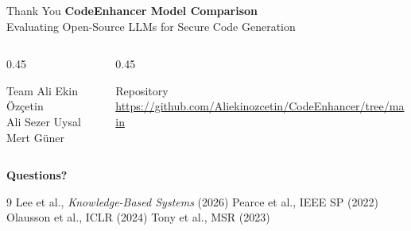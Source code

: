 \documentclass[aspectratio=169]{beamer}
\begin{document}
\begin{frame}{Thank You}
  \centering
  \vspace{0.8em}
  {\Large \textbf{CodeEnhancer Model Comparison}}\\[0.4em]
  {\normalsize Evaluating Open-Source LLMs for Secure Code Generation}

  \vspace{1.2em}

  \begin{columns}[c]
    \begin{column}{0.45\textwidth}
      \centering
      \begin{block}{Team}
        Ali Ekin Özçetin \\
        Ali Sezer Uysal \\
        Mert Güner
      \end{block}
    \end{column}
    \begin{column}{0.45\textwidth}
      \centering
      \begin{block}{Repository}
        \small \url{https://github.com/Aliekinozcetin/CodeEnhancer/tree/main}
      \end{block}
    \end{column}
  \end{columns}

  \vspace{1.2em}
  {\LARGE \textbf{Questions?}}

  \vspace{0.5em}
  \tiny
  \begin{thebibliography}{9}
     Lee et al., \textit{Knowledge-Based Systems} (2026)
     Pearce et al., IEEE SP (2022)
     Olausson et al., ICLR (2024)
     Tony et al., MSR (2023)
  \end{thebibliography}
\end{frame}
\end{document}
